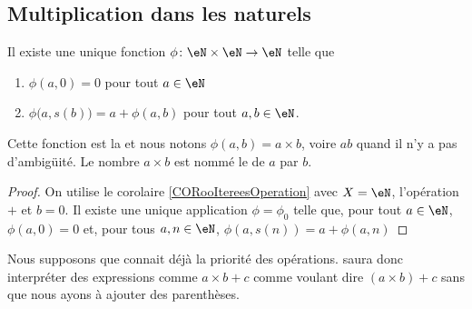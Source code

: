 \subsection{Multiplication dans les naturels}
\label{SUBooMultiplicationNaturels}

\begin{propositionDef}      \label{PROPooBBQPooRgPOjf}
	Il existe une unique fonction \( \phi \colon \eN\times \eN\to \eN\) telle que
	\begin{enumerate}
		\item       \label{ITEMooNTUUooDAUVsV}
		      \( \phi (a,0)=0\) pour tout \( a\in \eN\)
		\item       \label{ITEMooPPZZooQQabwn}
		      \( \phi \big( a,s(b) \big) = a + \phi(a,b)\) pour tout \( a,b\in \eN\).
	\end{enumerate}
	Cette fonction est la  et nous notons \( \phi (a,b)=a\times b\), voire \( ab\) quand il n'y a pas d'ambigüité. Le nombre \( a\times b\) est nommé le  de \( a\) par \( b\).
\end{propositionDef}

\begin{proof}
	On utilise le corolaire \ref{CORooItereesOperation} avec \( X = \eN \), l'opération \( + \) et \( b = 0 \). Il existe une unique application \( \phi = \phi_0 \) telle que, pour tout \( a \in \eN \), \( \phi (a,0) = 0 \) et, pour tous \(a, n \in \eN \), \( \phi(a, s(n)) = a + \phi(a, n) \)
\end{proof}

\begin{normaltext}	\label{NORMooPrioriteOperations}
	Nous supposons que  connait déjà la priorité des opérations.  saura donc interpréter des expressions comme \( a\times b+c\) comme voulant dire \( (a\times b)+c\) sans que nous ayons à ajouter des parenthèses.
\end{normaltext}

